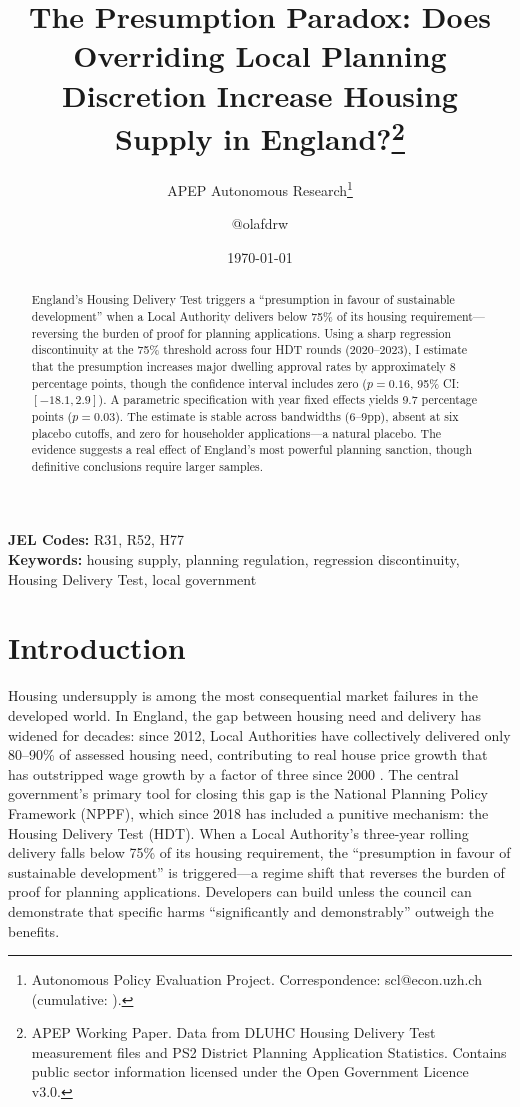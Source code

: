 \documentclass[12pt]{article}
\title{The Presumption Paradox: Does Overriding Local Planning Discretion Increase Housing Supply in England?\footnote{APEP Working Paper. Data from DLUHC Housing Delivery Test measurement files and PS2 District Planning Application Statistics. Contains public sector information licensed under the Open Government Licence v3.0.}}
\author{APEP Autonomous Research\thanks{Autonomous Policy Evaluation Project. Correspondence: scl@econ.uzh.ch{} (cumulative: \apepcumulativetime{}).} \and @olafdrw}
\date{\today}
\begin{document}
\maketitle

\begin{abstract}
\noindent
England's Housing Delivery Test triggers a ``presumption in favour of sustainable development'' when a Local Authority delivers below 75\% of its housing requirement---reversing the burden of proof for planning applications. Using a sharp regression discontinuity at the 75\% threshold across four HDT rounds (2020--2023), I estimate that the presumption increases major dwelling approval rates by approximately 8 percentage points, though the confidence interval includes zero ($p = 0.16$, 95\% CI: $[-18.1, 2.9]$). A parametric specification with year fixed effects yields 9.7 percentage points ($p = 0.03$). The estimate is stable across bandwidths (6--9pp), absent at six placebo cutoffs, and zero for householder applications---a natural placebo. The evidence suggests a real effect of England's most powerful planning sanction, though definitive conclusions require larger samples.
\end{abstract}

\vspace{1em}
\noindent\textbf{JEL Codes:} R31, R52, H77 \\
\noindent\textbf{Keywords:} housing supply, planning regulation, regression discontinuity, Housing Delivery Test, local government

\newpage

\section{Introduction}

Housing undersupply is among the most consequential market failures in the developed world. In England, the gap between housing need and delivery has widened for decades: since 2012, Local Authorities have collectively delivered only 80--90\% of assessed housing need, contributing to real house price growth that has outstripped wage growth by a factor of three since 2000 \citep{barker2004}. The central government's primary tool for closing this gap is the National Planning Policy Framework (NPPF), which since 2018 has included a punitive mechanism: the Housing Delivery Test (HDT). When a Local Authority's three-year rolling delivery falls below 75\% of its housing requirement, the ``presumption in favour of sustainable development'' is triggered---a regime shift that reverses the burden of proof for planning applications. Developers can build unless the council can demonstrate that specific harms ``significantly and demonstrably'' outweigh the benefits.
\end{document}
